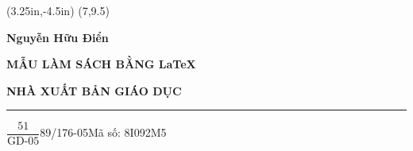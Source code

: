 \setlength{\fboxrule}{8pt}
\thisfancyput(3.25in,-4.5in){
\setlength{\unitlength}{1in}\setlength{\fboxrule}{4pt}\fancyoval(7,9.5)
}
\begin{titlepage}
 \centerline{\bf Nguyễn Hữu Điển}
\vspace*{5cm}
 \centerline{\Huge\bf  MẪU LÀM SÁCH BẰNG \LaTeX}
\vspace*{0.5cm}

\vfill
 \centerline{\bf NHÀ XUẤT BẢN GIÁO DỤC}
\end{titlepage}
\newpage
\vspace*{5cm}
\vfill
\hrule

$\dfrac{\mbox{51}}{\mbox{GD-05}}$89/176-05\hfill Mã số: 8I092M5
\thispagestyle{empty}